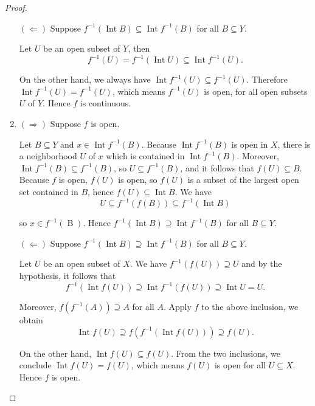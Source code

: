 \begin{proof}
\begin{enumerate}[label={(\alph*)}]
		      $(\Longleftarrow)$ Suppose $f^{-1}(\operatorname{Int}B) \subseteq \operatorname{Int}f^{-1}(B)$ for all $B\subseteq Y$.

		      Let $U$ be an open subset of $Y$, then
		      \[
			      f^{-1}(U) = f^{-1}(\operatorname{Int}U) \subseteq \operatorname{Int}f^{-1}(U).
		      \]

		      On the other hand, we always have $\operatorname{Int} f^{-1}(U)\subseteq f^{-1}(U)$. Therefore $\operatorname{Int} f^{-1}(U) = f^{-1}(U)$, which means $f^{-1}(U)$ is open, for all open subsets $U$ of $Y$. Hence $f$ is continuous.
		\item $(\Longrightarrow)$ Suppose $f$ is open.

		      Let $B\subseteq Y$ and $x\in \operatorname{Int}f^{-1}(B)$. Because $\operatorname{Int}f^{-1}(B)$ is open in $X$, there is a neighborhood $U$ of $x$ which is contained in $\operatorname{Int}f^{-1}(B)$. Moreover, $\operatorname{Int}f^{-1}(B)\subseteq f^{-1}(B)$, so $U\subseteq f^{-1}(B)$, and it follows that $f(U)\subseteq B$. Because $f$ is open, $f(U)$ is open, so $f(U)$ is a subset of the largest open set contained in $B$, hence $f(U)\subseteq \operatorname{Int}B$. We have
		      \[
			      U\subseteq f^{-1}(f(B))\subseteq f^{-1}(\operatorname{Int}B)
		      \]

		      so $x\in f^{-1}(\operatorname{B})$. Hence $f^{-1}(\operatorname{Int}B)\supseteq \operatorname{Int}f^{-1}(B)$ for all $B\subseteq Y$.

		      $(\Longleftarrow)$ Suppose $f^{-1}(\operatorname{Int}B)\supseteq \operatorname{Int}f^{-1}(B)$ for all $B\subseteq Y$.

		      Let $U$ be an open subset of $X$. We have $f^{-1}(f(U))\supseteq U$ and by the hypothesis, it follows that
		      \[
			      f^{-1}(\operatorname{Int}f(U)) \supseteq \operatorname{Int}f^{-1}(f(U)) \supseteq \operatorname{Int}U = U.
		      \]

		      Moreover, $f(f^{-1}(A))\supseteq A$ for all $A$. Apply $f$ to the above inclusion, we obtain
		      \[
			      \operatorname{Int}f(U)\supseteq f(f^{-1}(\operatorname{Int}f(U)))\supseteq f(U).
		      \]

		      On the other hand, $\operatorname{Int}f(U)\subseteq f(U)$. From the two inclusions, we conclude $\operatorname{Int}f(U) = f(U)$, which means $f(U)$ is open for all $U\subseteq X$. Hence $f$ is open.
	\end{enumerate}
\end{proof}

